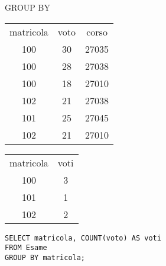 \begin{frame}{GROUP BY}
\begin{table}[h]
\centering
\begin{minipage}{.45\textwidth}
\centering
\begin{tabular}{|c|c|c|}
\hline
\rowcolor{cyan!30} \multicolumn{3}{|c|}{Esame} \\
\hline
\rowcolor{cyan!30} matricola  & voto & corso \\
\hline
100  & 30 & 27035 \\
100  & 28 & 27038 \\
100  & 18 & 27010 \\
102  & 21 & 27038 \\
101  & 25 & 27045 \\
102 & 21 & 27010 \\
\hline
\end{tabular}
\end{minipage}%
\begin{minipage}{.45\textwidth}
\centering
\begin{tabular}{|c|c|}
\hline
\rowcolor{cyan!30} \multicolumn{2}{|c|}{Result} \\
\hline
\rowcolor{cyan!30} matricola  & voti \\
\hline
100  & 3 \\
101  & 1  \\
102  & 2 \\
\hline
\end{tabular}
\end{minipage}
\end{table}
\vspace{2em}
\texttt{SELECT matricola, COUNT(voto) AS voti\\FROM Esame\\GROUP BY matricola;}
\end{frame}
